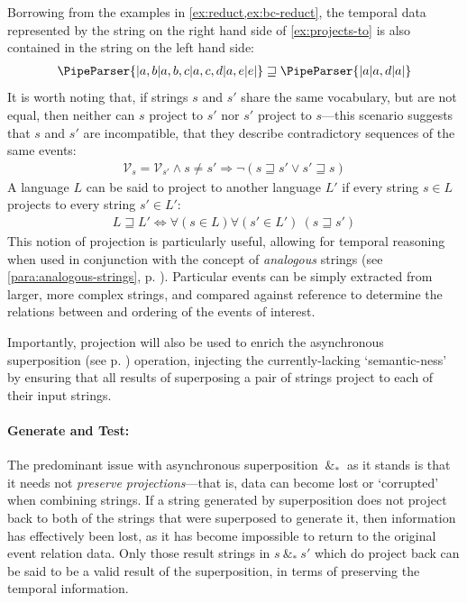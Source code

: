 \documentclass[a4paper,12pt,leqno,twoside]{article}
\newcommand{\vph}[1]{\vphantom{#1}}
\newcommand{\ebox}[1]{\fbox{$\vph{'(),}#1$}}
\newcommand{\spasync}{~\&_*~}
\newcommand{\V}{\mathcal{V}}
\newcommand{\EventString}[1]{%
	\renewcommand*{\do}[1]{\ebox{##1}}%
	\PipeParser{#1}%
}
\begin{document}
Borrowing from the examples in \cref{ex:reduct,ex:bc-reduct}, the temporal data represented by the string on the right hand side of \cref{ex:projects-to} is also contained in the string on the left hand side:
\begin{align}\label{ex:projects-to}
	\EventString{{}|a,b|a,b,c|a,c,d|a,e|e|{}} \sqsupseteq \EventString{{}|a|a,d|a|{}}
\end{align}
It is worth noting that, if strings $s$ and $s'$ share the same vocabulary, but are not equal, then neither can $s$ project to $s'$ nor $s'$ project to $s$---this scenario suggests that $s$ and $s'$ are incompatible, that they describe contradictory sequences of the same events:
\begin{align}\label{impl:cannot-project}
	\V_s = \V_{s'} \wedge s \neq s' \Longrightarrow \lnot (s \sqsupseteq s' \lor s' \sqsupseteq s)
\end{align}
A language $L$ can be said to project to another language $L'$ if every string $s \in L$ projects to every string $s' \in L'$:
\begin{align}
	L \sqsupseteq L' \Longleftrightarrow  \forall (s \in L)\forall (s' \in L')~ (s \sqsupseteq s')\label{def:lang-projection}
\end{align}
This notion of projection is particularly useful, allowing for temporal reasoning when used in conjunction with the concept of \textit{analogous} strings (see \cref{para:analogous-strings}, p. \pageref{para:analogous-strings}). Particular events can be simply extracted from larger, more complex strings, and compared against reference to determine the relations between and ordering of the events of interest.

Importantly, projection will also be used to enrich the asynchronous superposition (see p. \pageref{def:async-superposition}) operation, injecting the currently-lacking `semantic-ness' by ensuring that all results of superposing a pair of strings project to each of their input strings.

\paragraph{Generate and Test:}\label{para:gen-and-test}
The predominant issue with asynchronous superposition $\spasync$ as it stands is that it needs not \textit{preserve projections}---that is, data can become lost or `corrupted' when combining strings. If a string generated by superposition does not project back to both of the strings that were superposed to generate it, then information has effectively been lost, as it has become impossible to return to the original event relation data. Only those result strings in $s \spasync s'$ which do project back can be said to be a valid result of the superposition, in terms of preserving the temporal information.
\end{document}

